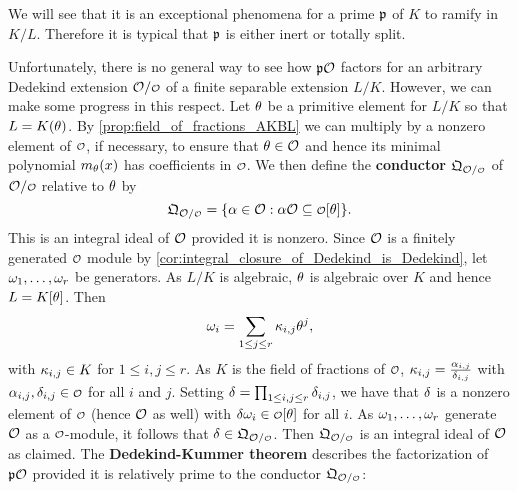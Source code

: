     \begin{remark}
      We will see that it is an exceptional phenomena for a prime $\mathfrak{p}$ of $K$ to ramify in $K/L$. Therefore it is typical that $\mathfrak{p}$ is either inert or totally split.
    \end{remark}

    Unfortunately, there is no general way to see how $\mathfrak{p}\mathcal{O}$ factors for an arbitrary Dedekind extension $\mc{O}/\smc{O}$ of a finite separable extension $L/K$. However, we can make some progress in this respect. Let $\theta$ be a primitive element for $L/K$ so that $L = K(\theta)$. By \cref{prop:field_of_fractions_AKBL} we can multiply by a nonzero element of $\smc{O}$, if necessary, to ensure that $\theta \in \mathcal{O}$ and hence its minimal polynomial $m_{\theta}(x)$ has coefficients in $\smc{O}$. We then define the \textbf{conductor} $\mf{Q}_{\mc{O}/\smc{O}}$ of $\mc{O}/\smc{O}$ relative to $\theta$ by
    \[
      \mf{Q}_{\mc{O}/\smc{O}} = \{\a \in \mc{O}:\a\mc{O} \subseteq \smc{O}[\t]\}.
    \]
    This is an integral ideal of $\mathcal{O}$ provided it is nonzero. Since $\mathcal{O}$ is a finitely generated $\smc{O}$ module by \cref{cor:integral_closure_of_Dedekind_is_Dedekind}, let $\omega_{1},\ldots,\omega_{r}$ be generators. As $L/K$ is algebraic, $\theta$ is algebraic over $K$ and hence $L = K[\theta]$. Then
    \[
      \omega_{i} = \sum_{1 \le j \le r}\kappa_{i,j}\theta^{j},
    \]
    with $\kappa_{i,j} \in K$ for $1 \le i,j \le r$. As $K$ is the field of fractions of $\smc{O}$, $\kappa_{i,j} = \frac{\alpha_{i,j}}{\delta_{i,j}}$ with $\a_{i,j},\d_{i,j} \in \smc{O}$ for all $i$ and $j$. Setting $\delta = \prod_{1 \le i,j \le r}\delta_{i,j}$, we have that $\delta$ is a nonzero element of $\smc{O}$ (hence $\mathcal{O}$ as well) with $\d\w_{i} \in \smc{O}[\t]$ for all $i$. As $\omega_{1},\ldots,\omega_{r}$ generate $\mathcal{O}$ as a $\smc{O}$-module, it follows that $\d \in \mf{Q}_{\mc{O}/\smc{O}}$. Then $\mf{Q}_{\mc{O}/\smc{O}}$ is an integral ideal of $\mathcal{O}$ as claimed. The \textbf{Dedekind-Kummer theorem} describes the factorization of $\mathfrak{p}\mathcal{O}$ provided it is relatively prime to the conductor $\mf{Q}_{\mc{O}/\smc{O}}$:

